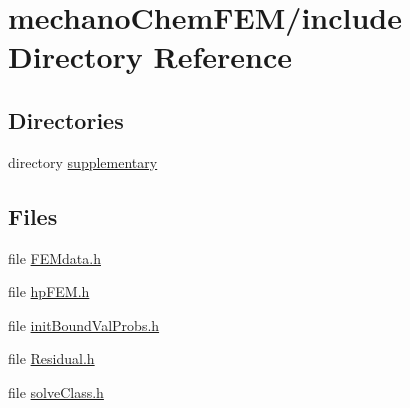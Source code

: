 \section{mechano\+Chem\+F\+E\+M/include Directory Reference}
\label{dir_3f9746961dfccc1d4c6542f721edbabc}
\subsection*{Directories}
\begin{DoxyCompactItemize}
\item 
directory \mbox{\hyperlink{dir_4f8747bbf109c66729f4d31acb1f13e9}{supplementary}}
\end{DoxyCompactItemize}
\subsection*{Files}
\begin{DoxyCompactItemize}
\item 
file \mbox{\hyperlink{_f_e_mdata_8h}{F\+E\+Mdata.\+h}}
\item 
file \mbox{\hyperlink{hp_f_e_m_8h}{hp\+F\+E\+M.\+h}}
\item 
file \mbox{\hyperlink{init_bound_val_probs_8h}{init\+Bound\+Val\+Probs.\+h}}
\item 
file \mbox{\hyperlink{_residual_8h}{Residual.\+h}}
\item 
file \mbox{\hyperlink{solve_class_8h}{solve\+Class.\+h}}
\end{DoxyCompactItemize}
